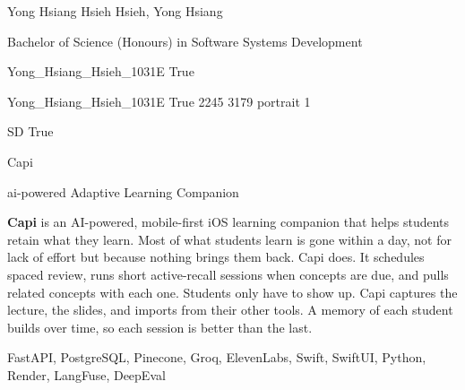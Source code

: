 \documentclass[twoside]{report}
\begin{document}
\begingroup{}\relax



\def\Key{Yong_Hsiang_Hsieh_1031E}

{Yong Hsiang Hsieh}
{Hsieh, Yong Hsiang}

{Bachelor of Science (Honours) in Software Systems Development}

{Yong_Hsiang_Hsieh_1031E}
{True}

{Yong_Hsiang_Hsieh_1031E}
{True}
{2245}
{3179}
{portrait}
{1}

{SD}
{True}

{Capi}

{ai-powered Adaptive Learning Companion}

{{\bfseries Capi} is an AI-powered, mobile-first iOS learning companion that helps students retain what they learn. Most of what students learn is gone within a day, not for lack of effort but because nothing brings them back. Capi does. It schedules spaced review, runs short active-recall sessions when concepts are due, and pulls related concepts with each one. Students only have to show up. Capi captures the lecture, the slides, and imports from their other tools. A memory of each student builds over time, so each session is better than the last.}

{FastAPI, PostgreSQL, Pinecone, Groq, ElevenLabs, Swift, SwiftUI, Python, Render, LangFuse, DeepEval}
\end{document}
